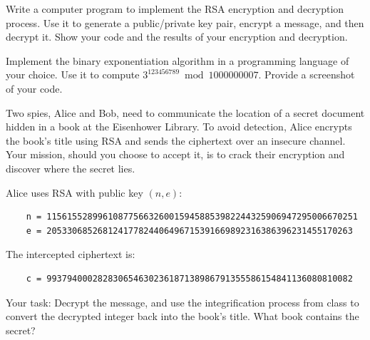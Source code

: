 \documentclass[12pt]{exam}
\begin{document}
\begin{questions}
\question[1] Write a computer program to implement the RSA encryption and decryption process. Use it to generate a public/private key pair, encrypt a message, and then decrypt it. Show your code and the results of your encryption and decryption.

\question[2] Implement the binary exponentiation algorithm in a programming language of your choice. Use it to compute $3^{123456789} \bmod 1000000007$. Provide a screenshot of your code. 

\question[1] Two spies, Alice and Bob, need to communicate the location of a secret document hidden in a book at the Eisenhower Library. To avoid detection, Alice encrypts the book's title using RSA and sends the ciphertext over an insecure channel. Your mission, should you choose to accept it, is to crack their encryption and discover where the secret lies.

Alice uses RSA with public key $(n, e)$: 
\begin{verbatim}
    n = 1156155289961087756632600159458853982244325906947295006670251
    e = 205330685268124177824406496715391669892316386396231455170263
\end{verbatim}

The intercepted ciphertext is: 
\begin{verbatim}
    c = 993794000282830654630236187138986791355586154841136080810082
\end{verbatim}

Your task: Decrypt the message, and use the integrification process from class to convert the decrypted integer back into the book's title. What book contains the secret?


\end{questions}
\end{document}
